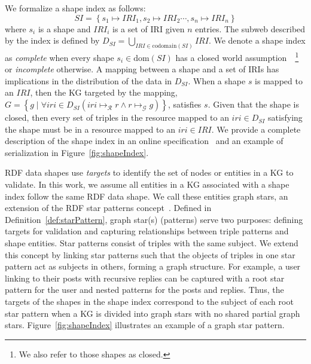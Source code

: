 We formalize a shape index as follows:
\begin{equation}\label{eq:shapeIndex}
   SI = \left\{ s_1 \mapsto IRI_1, s_2 \mapsto IRI_2 \cdots, s_n \mapsto IRI_n \right\}
\end{equation}
where $s_i$ is a shape and $IRI_i$ is a set of IRI given $n$ entries.
The subweb described by the index is defined by $D_{SI} = \bigcup_{IRI \in \text{codomain}(SI)} IRI$.
We denote a shape index as \emph{complete} when every shape $s_i \in \text{dom}(SI)$ has a closed world assumption~\cite{Gayo2018b, Gayo2018}~\footnote{We also refer to those shapes as closed.} or \emph{incomplete} otherwise.
A mapping between a shape and a set of IRIs has implications in the distribution of the data in $D_{SI}$.
When a shape $s$ is mapped to an $IRI$, then the KG targeted by the mapping, $G = \left\{ g \mid \forall iri \in D_{SI} (iri \mapsto_{\mathcal{R}} r \land r \mapsto_{\mathcal{G}} g) \right\}$, satisfies $s$.
Given that the shape is closed, then every set of triples in the resource mapped to an $iri \in D_{SI}$ satisfying the shape must be in a resource mapped to an $iri \in IRI$.
We provide a complete description of the shape index in an online specification~ and an example of serialization in Figure~\ref{fig:shapeIndex}.

RDF data shapes use \emph{targets} to identify the set of nodes or entities in a KG to validate.  
In this work, we assume all entities in a KG associated with a shape index follow the same RDF data shape.  
We call these entities graph stars, an extension of the RDF star patterns concept~\cite{Karim2020}.  
Defined in Definition~\ref{def:starPattern}, graph star(s) (patterns)  serve two purposes:
defining targets for validation and capturing relationships between triple patterns and shape entities.  
Star patterns consist of triples with the same subject.
We extend this concept by linking star patterns such that the objects of triples in one star pattern act as subjects in others, forming a graph structure.
For example, a user linking to their posts with recursive replies can be captured with a root star pattern for the user and nested patterns for the posts and replies.  
Thus, the targets of the shapes in the shape index correspond to the subject of each root star pattern when a KG is divided into graph stars with no shared partial graph stars.  
Figure~\ref{fig:shapeIndex} illustrates an example of a graph star pattern.


